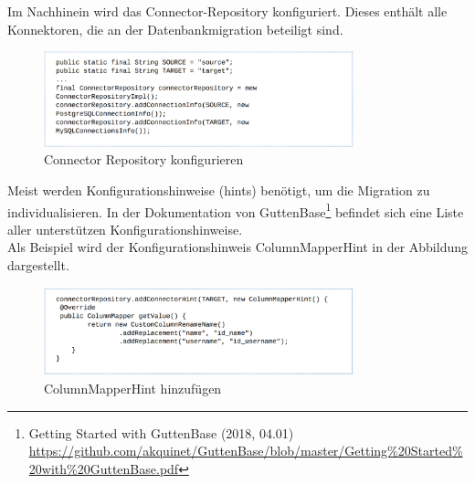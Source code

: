 	Im Nachhinein wird das Connector-Repository konfiguriert. Dieses enthält alle Konnektoren, die an der Datenbankmigration beteiligt sind.
	\begin{figure}[H]
		\centering
		\includegraphics[width=0.8\textwidth]{images/gb/repo}
		\caption{Connector Repository konfigurieren}
		\label{img:gb/repo}
	\end{figure}
	
	Meist werden Konfigurationshinweise (hints) benötigt, um die Migration zu individualisieren. In der Dokumentation von GuttenBase\footnote{Getting Started with GuttenBase (2018, 04.01) \\ \url{https://github.com/akquinet/GuttenBase/blob/master/Getting\%20Started\%20with\%20GuttenBase.pdf}} befindet sich eine Liste aller unterstützen Konfigurationshinweise. \\
	Als Beispiel wird der Konfigurationshinweis ColumnMapperHint in der Abbildung dargestellt.
	\begin{figure}[H]
		\centering
		\includegraphics[width=0.8\textwidth]{images/gb/rename}
		\caption{ColumnMapperHint hinzufügen}
		\label{img:gb/rename}
	\end{figure}
	
